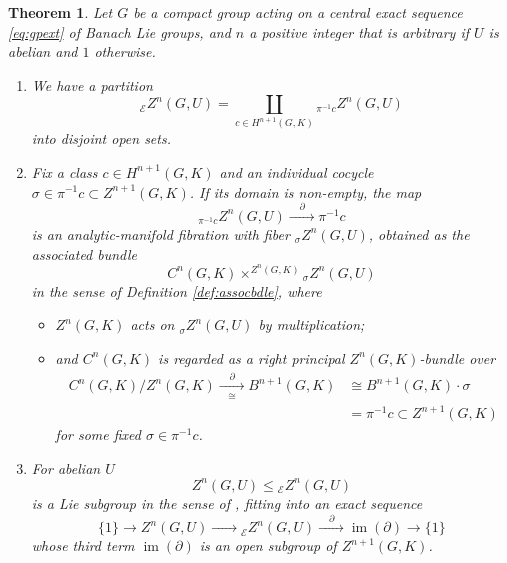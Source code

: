 \documentclass[pdftex]{sigma}
\numberwithin{equation}{section}
\newtheorem{Theorem}{Theorem}[section]
\newcommand\cE{{\mathcal E}}
\DeclareMathOperator{\im}{\mathrm{im}}
\begin{document}
\begin{Theorem}\label{th:relcocfiber}
 Let $G$ be a compact group acting on a central exact sequence \eqref{eq:gpext} of Banach Lie groups, and $n$ a positive integer that is arbitrary if $U$ is abelian and $1$ otherwise.
 \begin{enumerate}[$(1)$]\itemsep=0pt
 \item\label{item:relcocfiber1} We have a partition
 \begin{equation*}
 {}_{\cE}Z^n(G,U) = \coprod_{c\in H^{n+1}(G,K)}{}_{\pi^{-1}c} Z^n(G,U)
 \end{equation*}
 into disjoint open sets.
 \item\label{item:relcocfiber2} Fix a class $c\in H^{n+1}(G,K)$ and an individual cocycle $\sigma\in \pi^{-1}c\subset Z^{n+1}(G,K)$. If its domain is non-empty, the map
 \begin{equation}\label{eq:relznfibers}
 {}_{\pi^{-1}c}Z^n(G,U)\xrightarrow{\quad\partial\quad}\pi^{-1}c
 \end{equation}
 is an analytic-manifold fibration with fiber ${}_{\sigma}Z^n(G,U)$, obtained as the associated bundle
 \begin{equation*}
 C^{n}(G,K)\times^{Z^{n}(G,K)}{}_{\sigma}Z^n(G,U)
 \end{equation*}
 in the sense of Definition {\rm \ref{def:assocbdle}}, where
 \begin{itemize}\itemsep=0pt
 \item $Z^{n}(G,K)$ acts on ${}_{\sigma}Z^n(G,U)$ by multiplication;
 \item and $C^n(G,K)$ is regarded as a right principal $Z^n(G,K)$-bundle over
 \begin{align*}
 C^n(G,K)/Z^n(G,K) \xrightarrow[\cong]{\quad\partial\quad}
 B^{n+1}(G,K) &\cong B^{n+1}(G,K)\cdot \sigma\\
 &= \pi^{-1}c\subset Z^{n+1}(G,K)
 \end{align*}
 for some fixed $\sigma\in \pi^{-1}c$.
 \end{itemize}

 \item\label{item:relcocfiber3} For abelian $U$
 \begin{equation*}
 Z^n(G,U)
 \le
 {}_{\cE}Z^n(G,U)
 \end{equation*}
 is a Lie subgroup in the sense of {\rm\cite[\emph{Section}~III.1.3, \emph{Definition} 3]{bourb-lie-13}}, fitting into an exact sequence
 \begin{equation}\label{eq:zezim}
 \{1\}
 \to
 Z^n(G,U)
 \xrightarrow{\quad\phantom{\partial}\quad}
 {}_{\cE}Z^n(G,U)
 \xrightarrow{\quad\partial\quad}
 \im(\partial)
 \to
 \{1\}
 \end{equation}
 whose third term $\im(\partial)$ is an open subgroup of $Z^{n+1}(G,K)$.

 \end{enumerate}
\end{Theorem}
\end{document}
